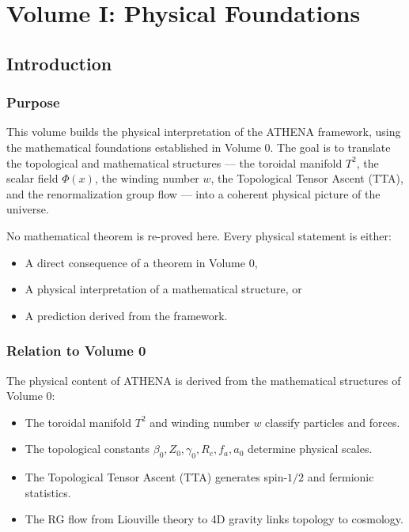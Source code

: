 \documentclass[12pt,oneside]{book}
\begin{document}
\mainmatter

\part{Volume I: Physical Foundations}

\chapter{Introduction}

\section{Purpose}

This volume builds the physical interpretation of the ATHENA framework, using the mathematical foundations established in Volume 0. The goal is to translate the topological and mathematical structures — the toroidal manifold $T^2$, the scalar field $\Phi(x)$, the winding number $w$, the Topological Tensor Ascent (TTA), and the renormalization group flow — into a coherent physical picture of the universe.

No mathematical theorem is re-proved here. Every physical statement is either:
\begin{itemize}
    \item A direct consequence of a theorem in Volume 0,
    \item A physical interpretation of a mathematical structure, or
    \item A prediction derived from the framework.
\end{itemize}

\section{Relation to Volume 0}

The physical content of ATHENA is derived from the mathematical structures of Volume 0:
\begin{itemize}
    \item The toroidal manifold $T^2$ and winding number $w$ classify particles and forces.
    \item The topological constants $\beta_0, Z_0, \gamma_0, R_c, f_a, a_0$ determine physical scales.
    \item The Topological Tensor Ascent (TTA) generates spin-$1/2$ and fermionic statistics.
    \item The RG flow from Liouville theory to 4D gravity links topology to cosmology.
\end{itemize}
\end{document}
